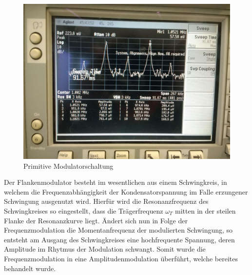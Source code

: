 \begin{figure}
	\centering
	\includegraphics[width=\textwidth]{img/Aufgabenteil_b.jpg}
	\caption{Primitive Modulatorschaltung}
	\label{abb:ringMod}
\end{figure}

Der Flankenmodulator besteht im wesentlichen aus einem Schwingkreis, in welchem die Frequenzabhängigkeit der Kondensatorspannung im Falle erzungener Schwingung ausgenutzt wird. Hierfür wird die Resonanzfrequenz des Schwingkreises so eingestellt, dass die Trägerfrequenz $\omega_T$ mitten in der steilen Flanke der Resonanzkurve liegt. Ändert sich nun in Folge der Frequenzmodulation die Momentanfrequenz der modulierten Schwingung, so entsteht am Ausgang des Schwingkreises eine hochfrequente Spannung, deren Amplitude im Rhytmus der Modulation schwangt. Somit wurde die Frequenzmodulation in eine Amplitudenmodulation überführt, welche bereites behandelt wurde.